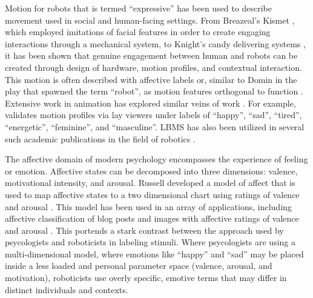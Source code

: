 \documentclass[arts,article,submit,moreauthors,pdftex,10pt,a4paper]{mdpi}
\begin{document}
Motion for robots that is termed ``expressive'' has been used to describe movement used in social and human-facing settings.  From Breazeal's Kismet \cite{breazeal2004designing}, which employed imitations of facial features in order to create engaging interactions through a mechanical system, to Knight's candy delivering systems \cite{knight2015taking}, it has been shown that genuine engagement between human and robots can be created through design of hardware, motion profiles, and contextual interaction.  
This motion is often described with affective labels \cite{breazeal1999context,knight2012acting,knight2014expressive} or, similar to Domin in the play that spawned the term ``robot'', as motion features orthogonal to function \cite{knight2015layering}.  Extensive work in animation has explored similar veins of work \cite{chaos,brand2000style,liu2005learning,torresani2007learning,gillies2009learning}.  For example, \cite{etemad2016expert} validates motion profiles via lay viewers under labels of ``happy'', ``sad'', ``tired'', ``energetic'', ``feminine'', and ``masculine''.  LBMS has also been utilized in several such academic publications in the field of robotics \cite{patla1982aspects,hudak,rett2007human,rett2008laban,masuda2009emotion,lourens2010communicating,masuda2010motion,knight2014expressive,knight2015layering,barakova2015observation,knight2016laban}.  

The affective domain of modern psychology encompasses the experience of feeling or emotion.  Affective states can be decomposed into three dimensions: valence, motivational intensity, and arousal. Russell developed a model of affect that is used to map affective states to a two dimensional chart using ratings of valence and arousal \cite{russell1980circumplex}. This model has been used in an array of applications, including affective classification of blog posts \cite{paltoglou2013seeing} and images with affective ratings of valence and arousal \cite{dan2011geneva,kurdi2017introducing}.  This portends a stark contrast between the approach used by psycologists and roboticists in labeling stimuli.  Where psycologists are using a multi-dimensional model, where emotions like ``happy'' and ``sad'' may be placed inside a less loaded and personal parameter space (valence, arousal, and motivation), roboticists use overly specific, emotive terms that may differ in distinct individuals and contexts.
\end{document}
